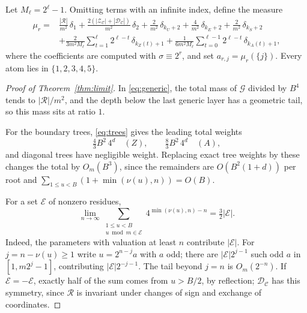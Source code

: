 \documentclass[11pt]{amsart}
\theoremstyle{remark}
\newcommand{\C}{\mathcal{C}}
\newcommand{\R}{\mathcal{R}}
\newcommand{\G}{\mathcal{G}}
\newcommand{\Zs}{\mathcal{Z}}
\newcommand{\Ds}{\mathcal{D}}
\newcommand{\vt}{\nu}
\begin{document}
Let $M_\ell=2^\ell-1$. Omitting terms with an infinite index, define the measure
\begin{equation}\label{eq:atoms}
\begin{aligned}
\mu_r={}&\frac{|\R|}{m^2}\,\delta_1+\frac{2(|\Zs_\C|+|\Ds_\C|)}{m^2}\,\delta_2+\frac{2}{m^2}\,\delta_{k_U+2}+\frac{4}{m^2}\,\delta_{k_E+2}+\frac{2}{m^2}\,\delta_{k_S+2}\\
&+\frac{2}{3m^2M_\ell}\sum_{t=1}^{\ell}2^{\ell-t}\,\delta_{k_Z(t)+1}+\frac{1}{6m^2M_\ell}\sum_{t=0}^{\ell-1}2^{\ell-t}\,\delta_{k_A(t)+1},
\end{aligned}
\end{equation}
where the coefficients are computed with $\sigma\equiv2^r$, and set $a_{r,j}=\mu_r(\{j\})$. Every atom lies in $\{1,2,3,4,5\}$.

\begin{proof}[Proof of Theorem~\ref{thm:limit}]
In \eqref{eq:generic}, the total mass of $\G$ divided by $B^4$ tends to $|\R|/m^2$, and the depth below the last generic layer has a geometric tail, so this mass sits at ratio $1$.

For the boundary trees, \eqref{eq:trees} gives the leading total weights
\[
\tfrac43B^2\,4^d\quad(Z),\qquad\tfrac83B^2\,4^d\quad(A),
\]
and diagonal trees have negligible weight. Replacing exact tree weights by these changes the total by $O_m(B^3)$, since the remainders are $O(B^2(1+d))$ per root and $\sum_{1\le u<B}(1+\min(\vt(u),n))=O(B)$.

For a set $\mathcal E$ of nonzero residues,
\begin{equation}\label{eq:valsum}
\lim_{n\to\infty}\sum_{\substack{1\le u<B\\u\bmod m\in\mathcal E}}4^{\min(\vt(u),n)-n}=\tfrac32|\mathcal E|.
\end{equation}
Indeed, the parameters with valuation at least $n$ contribute $|\mathcal E|$. For $j=n-\vt(u)\ge1$ write $u=2^{n-j}a$ with $a$ odd; there are $|\mathcal E|2^{j-1}$ such odd $a$ in $[1,m2^j-1]$, contributing $|\mathcal E|2^{-j-1}$. The tail beyond $j=n$ is $O_m(2^{-n})$. If $\mathcal E=-\mathcal E$, exactly half of the sum comes from $u>B/2$, by reflection; $\Ds_\C$ has this symmetry, since $\R$ is invariant under changes of sign and exchange of coordinates.


\end{proof}
\end{document}
